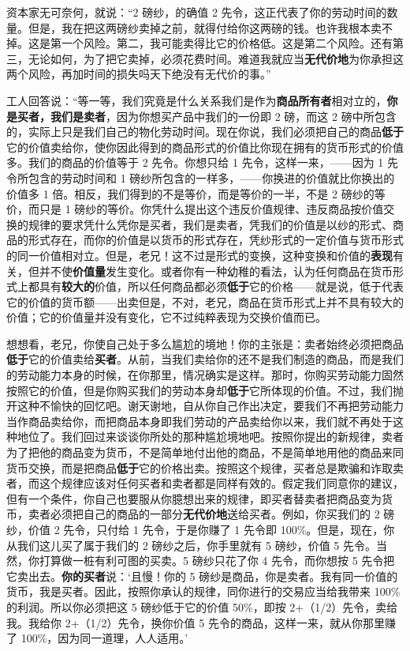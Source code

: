 资本家无可奈何，就说：“2 磅纱，的确值 2 先令，这正代表了你的劳动时间的数量。但是，我在把这两磅纱卖掉之前，就得付给你这两磅的钱。也许我根本卖不掉。这是第一个风险。第二，我可能卖得比它的价格低。这是第二个风险。还有第三，无论如何，为了把它卖掉，必须花费时间。难道我就应当\textbf{无代价地}为你承担这两个风险，再加时间的损失吗天下绝没有无代价的事。”

工人回答说：“等一等，我们究竟是什么关系我们是作为\textbf{商品所有者}相对立的，\textbf{你是买者，我们是卖者}，因为你想买产品中我们的一份即 2 磅，而这 2 磅中所包含的，实际上只是我们自己的物化劳动时间。现在你说，我们必须把自己的商品\textbf{低于}它的价值卖给你，使你因此得到的商品形式的价值比你现在拥有的货币形式的价值多。我们的商品的价值等于 2 先令。你想只给 1 先令，这样一来，——因为 1 先令所包含的劳动时间和 1 磅纱所包含的一样多，——你换进的价值就比你换出的价值多 1 倍。相反，我们得到的不是等价，而是等价的一半，不是 2 磅纱的等价，而只是 1 磅纱的等价。你凭什么提出这个违反价值规律、违反商品按价值交换的规律的要求凭什么凭你是买者，我们是卖者，凭我们的价值是以纱的形式、商品的形式存在，而你的价值是以货币的形式存在，凭纱形式的一定价值与货币形式的同一价值相对立。但是，老兄！这不过是形式的变换，这种变换和价值的\textbf{表现}有关，但并不使\textbf{价值量}发生变化。或者你有一种幼稚的看法，认为任何商品在货币形式上都具有\textbf{较大的}价值，所以任何商品都必须\textbf{低于}它的价格——就是说，低于代表它的价值的货币额——出卖但是，不对，老兄，商品在货币形式上并不具有较大的价值；它的价值量并没有变化，它不过纯粹表现为交换价值而已。

想想看，老兄，你使自己处于多么尴尬的境地！你的主张是：卖者始终必须把商品\textbf{低于}它的价值卖给\textbf{买者}。从前，当我们卖给你的还不是我们制造的商品，而是我们的劳动能力本身的时候，在你那里，情况确实是这样。那时，你购买劳动能力固然按照它的价值，但是你购买我们的劳动本身却\textbf{低于}它所体现的价值。不过，我们抛开这种不愉快的回忆吧。谢天谢地，自从你自己作出决定，要我们不再把劳动能力当作商品卖给你，而把商品本身即我们劳动的产品卖给你以来，我们就不再处于这种地位了。我们回过来谈谈你所处的那种尴尬境地吧。按照你提出的新规律，卖者为了把他的商品变为货币，不是简单地付出他的商品，不是简单地用他的商品来同货币交换，而是把商品\textbf{低于}它的价格出卖。按照这个规律，买者总是欺骗和诈取卖者，而这个规律应该对任何买者和卖者都是同样有效的。假定我们同意你的建议，但有一个条件，你自己也要服从你臆想出来的规律，即买者替卖者把商品变为货币，卖者必须把自己的商品的一部分\textbf{无代价地}送给买者。例如，你买我们的 2 磅纱，价值 2 先令，只付给 1 先令，于是你赚了 1 先令即 100\%。但是，现在，你从我们这儿买了属于我们的 2 磅纱之后，你手里就有 5 磅纱，价值 5 先令。当然，你打算做一桩有利可图的买卖。5 磅纱只花了你 4 先令，而你想按 5 先令把它卖出去。\textbf{你的买者}说：‘且慢！你的 5 磅纱是商品，你是卖者。我有同一价值的货币，我是买者。因此，按照你承认的规律，同你进行的交易应当给我带来 100\%的利润。所以你必须把这 5 磅纱低于它的价值 50\%，即按 2+（1/2）先令，卖给我。我给你 2+（1/2）先令，换你价值 5 先令的商品，这样一来，就从你那里赚了 100\%，因为同一道理，人人适用。’

